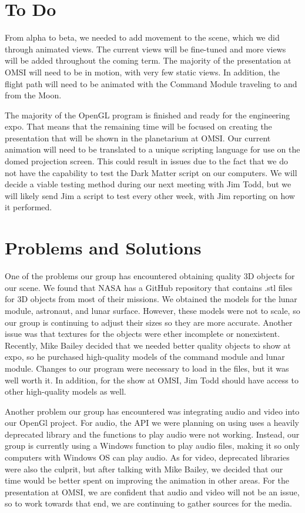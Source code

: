 \documentclass[onecolumn, draftclsnofoot,10pt, compsoc]{IEEEtran}
\begin{document}
\section{To Do}

From alpha to beta, we needed to add movement to the scene, which we did through animated views. The current views will be fine-tuned and more views will be added throughout the coming term. The majority of the presentation at OMSI will need to be in motion, with very few static views. In addition, the flight path will need to be animated with the Command Module traveling to and from the Moon. 

The majority of the OpenGL program is finished and ready for the engineering expo. That means that the remaining time will be focused on creating the presentation that will be shown in the planetarium at OMSI. Our current animation will need to be translated to a unique scripting language for use on the domed projection screen. This could result in issues due to the fact that we do not have the capability to test the Dark Matter script on our computers. We will decide a viable testing method during our next meeting with Jim Todd, but we will likely send Jim a script to test every other week, with Jim reporting on how it performed. 


\section{Problems and Solutions}

One of the problems our group has encountered obtaining quality 3D objects for our scene. We found that NASA has a GitHub repository that contains .stl files for 3D objects from most of their missions. We obtained the models for the lunar module, astronaut, and lunar surface. However, these models were not to scale, so our group is continuing to adjust their sizes so they are more accurate. Another issue was that textures for the objects were ether incomplete or nonexistent. Recently, Mike Bailey decided that we needed better quality objects to show at expo, so he purchased high-quality models of the command module and lunar module. Changes to our program were necessary to load in the files, but it was well worth it. In addition, for the show at OMSI, Jim Todd should have access to other high-quality models as well.  

Another problem our group has encountered was integrating audio and video into our OpenGl project. For audio, the API we were planning on using uses a heavily deprecated library and the functions to play audio were not working. Instead, our group is currently using a Windows function to play audio files, making it so only computers with Windows OS can play audio. As for video, deprecated libraries were also the culprit, but after talking with Mike Bailey, we decided that our time would be better spent on improving the animation in other areas. For the presentation at OMSI, we are confident that audio and video will not be an issue, so to work towards that end, we are continuing to gather sources for the media. 
\end{document}
